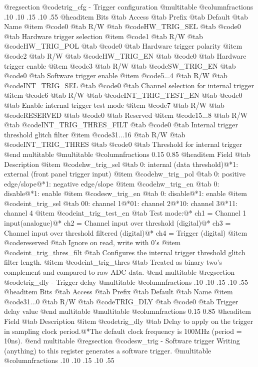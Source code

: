@regsection @code{trig_cfg} - Trigger configuration
@multitable @columnfractions .10 .10 .15 .10 .55
@headitem Bits @tab Access @tab Prefix @tab Default @tab Name
@item @code{0}
@tab R/W @tab
@code{HW_TRIG_SEL}
@tab @code{0} @tab 
Hardware trigger selection
@item @code{1}
@tab R/W @tab
@code{HW_TRIG_POL}
@tab @code{0} @tab 
Hardware trigger polarity
@item @code{2}
@tab R/W @tab
@code{HW_TRIG_EN}
@tab @code{0} @tab 
Hardware trigger enable
@item @code{3}
@tab R/W @tab
@code{SW_TRIG_EN}
@tab @code{0} @tab 
Software trigger enable
@item @code{5...4}
@tab R/W @tab
@code{INT_TRIG_SEL}
@tab @code{0} @tab 
Channel selection for internal trigger
@item @code{6}
@tab R/W @tab
@code{INT_TRIG_TEST_EN}
@tab @code{0} @tab 
Enable internal trigger test mode
@item @code{7}
@tab R/W @tab
@code{RESERVED}
@tab @code{0} @tab 
Reserved
@item @code{15...8}
@tab R/W @tab
@code{INT_TRIG_THRES_FILT}
@tab @code{0} @tab 
Internal trigger threshold glitch filter
@item @code{31...16}
@tab R/W @tab
@code{INT_TRIG_THRES}
@tab @code{0} @tab 
Threshold for internal trigger
@end multitable
@multitable @columnfractions 0.15 0.85
@headitem Field @tab Description
@item @code{hw_trig_sel} @tab 0: internal (data threshold)@*1: external (front panel trigger input)
@item @code{hw_trig_pol} @tab 0: positive edge/slope@*1: negative edge/slope
@item @code{hw_trig_en} @tab 0: disable@*1: enable
@item @code{sw_trig_en} @tab 0: disable@*1: enable
@item @code{int_trig_sel} @tab 00: channel 1@*01: channel 2@*10: channel 3@*11: channel 4
@item @code{int_trig_test_en} @tab Test mode:@* ch1 = Channel 1 input(analogue)@* ch2 = Channel input over threshold (digital)@* ch3 = Channel input over threshold filtered (digital)@* ch4 = Trigger (digital)
@item @code{reserved} @tab Ignore on read, write with 0's
@item @code{int_trig_thres_filt} @tab Configures the internal trigger threshold glitch filter length.
@item @code{int_trig_thres} @tab Treated as binary two's complement and compared to raw ADC data.
@end multitable
@regsection @code{trig_dly} - Trigger delay
@multitable @columnfractions .10 .10 .15 .10 .55
@headitem Bits @tab Access @tab Prefix @tab Default @tab Name
@item @code{31...0}
@tab R/W @tab
@code{TRIG_DLY}
@tab @code{0} @tab 
Trigger delay value
@end multitable
@multitable @columnfractions 0.15 0.85
@headitem Field @tab Description
@item @code{trig_dly} @tab Delay to apply on the trigger in sampling clock period.@*The default clock frequency is 100MHz (period = 10ns).
@end multitable
@regsection @code{sw_trig} - Software trigger
Writing (anything) to this register generates a software trigger.
@multitable @columnfractions .10 .10 .15 .10 .55
